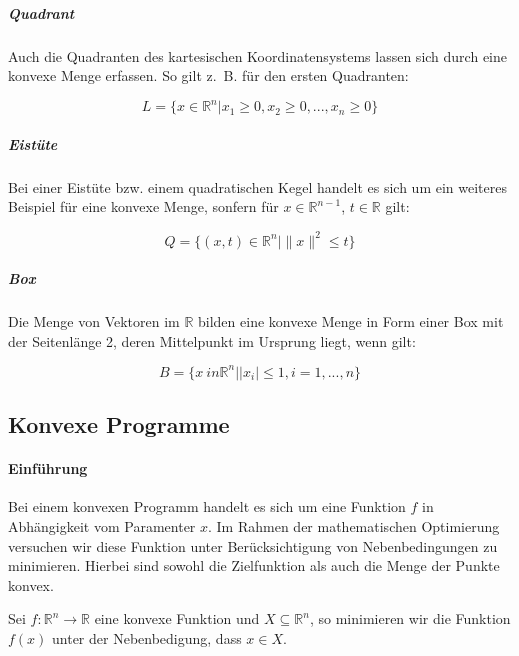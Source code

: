 \subparagraph{Quadrant}

Auch die Quadranten des kartesischen Koordinatensystems lassen sich durch eine konvexe Menge erfassen. So gilt z.~B. für den ersten Quadranten:

\begin{equation*}
L = \{ x \in \mathbb{R}^{n} | x_1 \ge 0, x_2 \ge 0, ..., x_n \ge 0\}
\end{equation*}

\subparagraph{Eistüte}

Bei einer Eistüte bzw. einem quadratischen Kegel handelt es sich um ein weiteres Beispiel für eine konvexe Menge, sonfern für $x \in \mathbb{R}^{n-1}$, $t \in \mathbb{R}$ gilt:

\begin{equation*}
Q = \{(x, t) \in \mathbb{R}^{n} | \lVert x\rVert ^{2} \le t\}
\end{equation*}

\subparagraph{Box}

Die Menge von Vektoren im $\mathbb{R}$ bilden eine konvexe Menge in Form einer Box mit der Seitenlänge 2, deren Mittelpunkt im Ursprung liegt, wenn gilt:

\begin{equation*}
B = \{x \ in \mathbb{R}^{n} | |x_{i}| \le 1, i = 1, ..., n\}
\end{equation*}

\subsection{Konvexe Programme}

\paragraph{Einführung}

Bei einem konvexen Programm handelt es sich um eine Funktion $f$ in Abhängigkeit vom Paramenter $x$. Im Rahmen der mathematischen Optimierung versuchen wir diese Funktion unter Berücksichtigung von Nebenbedingungen zu minimieren. Hierbei sind sowohl die Zielfunktion als auch die Menge der Punkte konvex.

\begin{Def}
Sei $f: \mathbb{R}^{n} \rightarrow \mathbb{R}$ eine konvexe Funktion und $X \subseteq \mathbb{R}^{n}$, so minimieren wir die Funktion $f(x)$ unter der Nebenbedigung, dass $x \in X$.
\end{Def}


